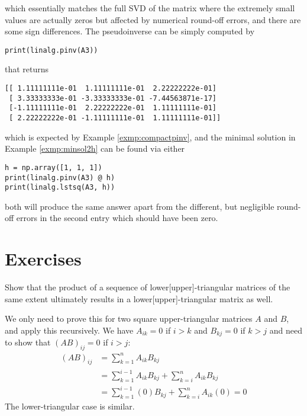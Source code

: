 which essentially matches the full SVD of the matrix where the extremely small values are actually zeros but affected by numerical round-off errors, and there are some sign differences. The pseudoinverse can be simply computed by
\begin{lstlisting}
print(linalg.pinv(A3))
\end{lstlisting}
that returns
\begin{lstlisting}
[[ 1.11111111e-01  1.11111111e-01  2.22222222e-01]
 [ 3.33333333e-01 -3.33333333e-01 -7.44563871e-17]
 [-1.11111111e-01  2.22222222e-01  1.11111111e-01]
 [ 2.22222222e-01 -1.11111111e-01  1.11111111e-01]]    
\end{lstlisting}
which is expected by Example \ref{exmp:compactpinv}, and the minimal solution in Example \ref{exmp:minsol2h} can be found via either
\begin{lstlisting}
h = np.array([1, 1, 1])
print(linalg.pinv(A3) @ h)
print(linalg.lstsq(A3, h))    
\end{lstlisting}
both will produce the same answer apart from the different, but negligible round-off errors in the second entry which should have been zero.

\section{Exercises}

\begin{Exercise}
\label{ex:triangularprod}
Show that the product of a sequence of lower[upper]-triangular matrices of the same extent ultimately results in a lower[upper]-triangular matrix as well.
\end{Exercise}
\begin{Answer}
We only need to prove this for two square upper-triangular matrices $A$ and $B$, and apply this recursively. We have $A_{ik} = 0$ if $i > k$ and $B_{kj} = 0$ if $k > j$ and need to show that $(AB)_{ij} = 0$ if $i > j$:
\begin{align*}
(AB)_{ij} &= \sum_{k=1}^n A_{ik}B_{kj} \\
&= \sum_{k=1}^{i-1} A_{ik}B_{kj} + \sum_{k=i}^n A_{ik}B_{kj} \\
&= \sum_{k=1}^{i-1} (0)B_{kj} + \sum_{k=i}^n A_{ik}(0) = 0
\end{align*}
The lower-triangular case is similar.
\end{Answer}

